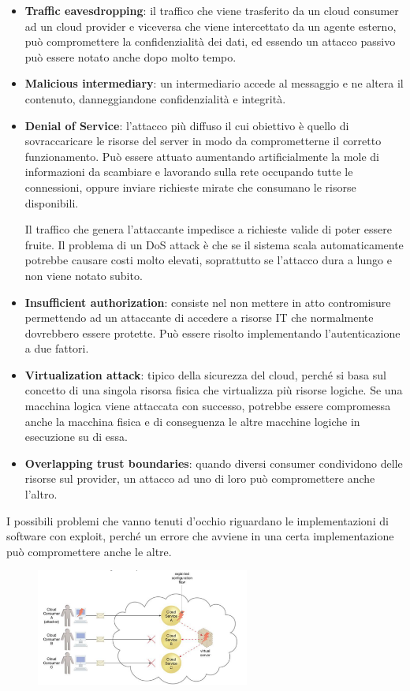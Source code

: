 \begin{itemize}
    \item \textbf{Traffic eavesdropping}: il traffico che viene trasferito da un cloud consumer ad un cloud provider e viceversa che viene intercettato da un agente esterno, può compromettere la confidenzialità dei dati, ed essendo un attacco passivo può essere notato anche dopo molto tempo.
    \item \textbf{Malicious intermediary}: un intermediario accede al messaggio e ne altera il contenuto, danneggiandone confidenzialità e integrità.
    \item \textbf{Denial of Service}: l'attacco più diffuso il cui obiettivo è quello di sovraccaricare le risorse del server in modo da comprometterne il corretto funzionamento. Può essere attuato aumentando artificialmente la mole di informazioni da scambiare e lavorando sulla rete occupando tutte le connessioni, oppure inviare richieste mirate che consumano le risorse disponibili.
    
    Il traffico che genera l'attaccante impedisce a richieste valide di poter essere fruite. Il problema di un DoS attack è che se il sistema scala automaticamente potrebbe causare costi molto elevati, soprattutto se l'attacco dura a lungo e non viene notato subito.
    \item \textbf{Insufficient authorization}: consiste nel non mettere in atto contromisure permettendo ad un attaccante di accedere a risorse IT che normalmente dovrebbero essere protette. Può essere risolto implementando l'autenticazione a due fattori.
    \item \textbf{Virtualization attack}: tipico della sicurezza del cloud, perché si basa sul concetto di una singola risorsa fisica che virtualizza più risorse logiche. Se una macchina logica viene attaccata con successo, potrebbe essere compromessa anche la macchina fisica e di conseguenza le altre macchine logiche in esecuzione su di essa.
    \item \textbf{Overlapping trust boundaries}: quando diversi consumer condividono delle risorse sul provider, un attacco ad uno di loro può compromettere anche l'altro.
\end{itemize}
I possibili problemi che vanno tenuti d'occhio riguardano le implementazioni di software con exploit, perché un errore che avviene in una certa implementazione può compromettere anche le altre.

\begin{figure}[htb!]
    \centering
    \includegraphics[width=7cm]{./Images/cap7/7.2.png}
\end{figure}


